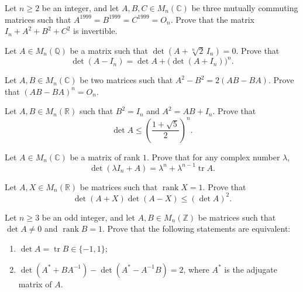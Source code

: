 \documentclass[12pt]{article}
\begin{document}
\begin{problem}
Let $n\ge 2$ be an integer, and let $A,B,C\in M_n(\mathbb{C})$ be three mutually commuting matrices such that $A^{1999}=B^{1999}=C^{1999}=O_n$. Prove that the matrix $I_n+A^2+B^2+C^2$ is invertible.
\end{problem}

\begin{problem}
Let $A\in M_n(\mathbb{Q})$ be a matrix such that $\det\!\left(A+\sqrt[n]{2}\,I_n\right)=0$. Prove that
\[
\det(A-I_n) = \det A + \big(\det(A+I_n)\big)^n.
\]
\end{problem}

\begin{problem}
Let $A,B\in M_n(\mathbb{C})$ be two matrices such that $A^2-B^2 = 2(AB-BA)$. Prove that $(AB-BA)^n = O_n$.
\end{problem}

\begin{problem}
Let $A,B\in M_n(\mathbb{R})$ such that $B^2=I_n$ and $A^2=AB+I_n$. Prove that
\[
\det A \le \left(\frac{1+\sqrt5}{2}\right)^n.
\]
\end{problem}

\begin{problem}
Let $A\in M_n(\mathbb{C})$ be a matrix of rank $1$. Prove that for any complex number $\lambda$,
\[
\det(\lambda I_n+A) = \lambda^n + \lambda^{n-1}\operatorname{tr}A.
\]
\end{problem}

\begin{problem}
Let $A,X\in M_n(\mathbb{R})$ be matrices such that $\operatorname{rank}X=1$. Prove that
\[
\det(A+X)\det(A-X) \le (\det A)^2.
\]
\end{problem}

\begin{problem}
Let $n\ge 3$ be an odd integer, and let $A,B\in M_n(\mathbb{Z})$ be matrices such that $\det A\ne 0$ and $\operatorname{rank}B=1$. Prove that the following statements are equivalent:
\begin{enumerate}[label=(\roman*)]
\item $\det A = \operatorname{tr}B \in \{-1,1\}$;
\item $\det(A^*+BA^{-1}) - \det(A^*-A^{-1}B) = 2$, where $A^*$ is the adjugate matrix of $A$.
\end{enumerate}
\end{problem}
\end{document}
